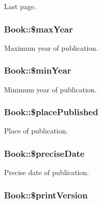 Last page. \hypertarget{classBook_a9e0fb12f3337abe8773af3065a179340}{
\subsubsection[{\$maxYear}]{\setlength{\rightskip}{0pt plus 5cm}Book::\$maxYear}}
\label{classBook_a9e0fb12f3337abe8773af3065a179340}
Maximum year of publication. \hypertarget{classBook_a7fd3b935f402594ad114dc3a91031e5d}{
\subsubsection[{\$minYear}]{\setlength{\rightskip}{0pt plus 5cm}Book::\$minYear}}
\label{classBook_a7fd3b935f402594ad114dc3a91031e5d}
Minimum year of publication. \hypertarget{classBook_a1e821cbef3523d8a43e4a8ba93dd3e3c}{
\subsubsection[{\$placePublished}]{\setlength{\rightskip}{0pt plus 5cm}Book::\$placePublished}}
\label{classBook_a1e821cbef3523d8a43e4a8ba93dd3e3c}
Place of publication. \hypertarget{classBook_ab52e10e77d272c21a60f4076452d21b3}{
\subsubsection[{\$preciseDate}]{\setlength{\rightskip}{0pt plus 5cm}Book::\$preciseDate}}
\label{classBook_ab52e10e77d272c21a60f4076452d21b3}
Precise date of publication. \hypertarget{classBook_a9716a8f1fd9835afde5b49620ff7477c}{
\subsubsection[{\$printVersion}]{\setlength{\rightskip}{0pt plus 5cm}Book::\$printVersion}}
